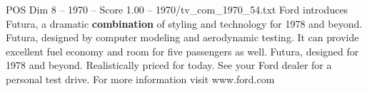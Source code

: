 \begin{textsample}{POS Dim 8 – 1970 – Score 1.00 – 1970/tv\_com\_1970\_54.txt}  \label{ex:f8_pos_090}
Ford introduces Futura, a dramatic \textbf{combination} of styling and technology for 1978 and beyond.
Futura, designed by computer modeling and aerodynamic testing.
It can provide excellent fuel economy and room for five passengers as well.
Futura, designed for 1978 and beyond.
Realistically priced for today.
See your Ford dealer for a personal test drive.
For more information visit www.ford.com

\end{textsample}
